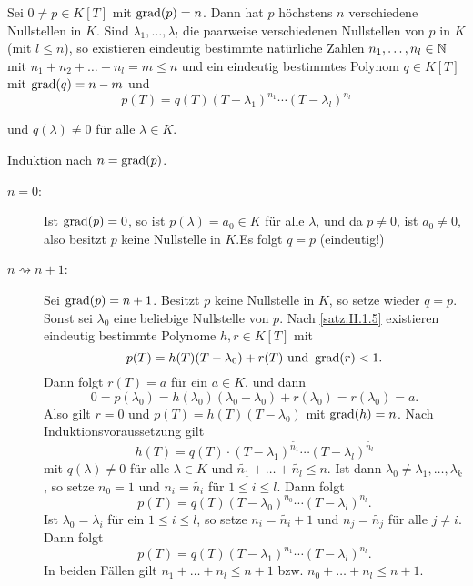 \begin{satz}
	\label{satz:II.1.6}
	Sei $0 \neq p \in K[T]$ mit $\operatorname{grad}(p) = n$.
	Dann hat $p$ höchstens $n$ verschiedene Nullstellen in $K$.
	Sind $\lambda_1,\dots,\lambda_l$ die paarweise verschiedenen Nullstellen von $p$ in $K$ (mit $l \leq n$), so existieren eindeutig bestimmte natürliche Zahlen $n_1,\dots,n_l \in \mathbb{N}$ mit $n_1+n_2+\dots+n_l = m \leq n$ und ein eindeutig bestimmtes Polynom $q \in K[T]$ mit $\operatorname{grad}(q) = n-m$ und
	\begin{equation}
		p(T) = q(T)(T-\lambda_1)^{n_1} \cdots (T-\lambda_l)^{n_l} \label{eq:II.1.6.1}
	\end{equation}
		
	und $q(\lambda) \neq 0$ für alle $\lambda \in K$.
\end{satz}

\begin{beweis}
	Induktion nach $n = \operatorname{grad}(p)$.
	\begin{description}
		\item[$n=0$:] Ist $\operatorname{grad}(p) = 0$, so ist $p(\lambda) = a_0 \in K$ für alle $\lambda$, und da $p \neq 0$, ist $a_0 \neq 0$, also besitzt $p$ keine Nullstelle in $K$.Es folgt $q = p$ (eindeutig!)
		\item[$n \rightsquigarrow n+1$:] Sei $\operatorname{grad}(p) = n+1$.
		Besitzt $p$ keine Nullstelle in $K$, so setze wieder $q = p$.
		Sonst sei $\lambda_0$ eine beliebige Nullstelle von $p$.
		Nach \autoref{satz:II.1.5} existieren eindeutig bestimmte Polynome $h,r \in K[T]$ mit 
		\[
			p(T) = h(T)(T-\lambda_0) + r(T) \text{ und } \operatorname{grad}(r) < 1.
		\]
		Dann folgt $r(T) = a$ für ein $a \in K$, und dann
		\[
			0 = p(\lambda_0) = h(\lambda_0)(\lambda_0-\lambda_0) + r(\lambda_0) = r(\lambda_0) = a.
		\]
		Also gilt $r = 0$ und $p(T) = h(T)(T-\lambda_0)$ mit $\operatorname{grad}(h) = n$.
		Nach Induktionsvoraussetzung gilt
		\[
			h(T) = q(T)\cdot (T-\lambda_1)^{\widetilde{n_1}} \cdots (T-\lambda_l)^{\widetilde{n_l}}
		\]
		mit $q(\lambda) \neq 0$ für alle $\lambda \in K$ und $\widetilde{n_1} + \dots + \widetilde{n_l} \leq n$.
		Ist dann $\lambda_0 \neq \lambda_1,\dots,\lambda_k$, so setze $n_0 = 1$ und $n_i = \widetilde{n_i}$ für $1 \leq i \leq l$.
		Dann folgt
		\[
			p(T) = q(T)(T-\lambda_0)^{n_0} \cdots (T-\lambda_l)^{n_l}.
		\]
		Ist $\lambda_0 = \lambda_i$ für ein $1 \leq i \leq l$, so setze $n_i = \widetilde{n_i} + 1$ und $n_j = \widetilde{n_j}$ für alle $j \neq i$.
		Dann folgt
		\[
			p(T) = q(T)(T-\lambda_1)^{n_1} \cdots (T-\lambda_l)^{n_l}.
		\]
		In beiden Fällen gilt $n_1+\dots+n_l \leq n+1$ bzw. $n_0 + \dots + n_l \leq n+1$.
		

\end{description}
\end{beweis}
